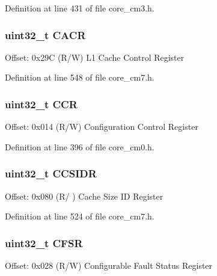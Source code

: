 Definition at line 431 of file core\+\_\+cm3.\+h.

\subsubsection[{\texorpdfstring{C\+A\+CR}{CACR}}]{ uint32\+\_\+t C\+A\+CR}\hypertarget{struct_s_c_b___type_a39711bf09810b078ac81b2c76c6908f6}{}\label{struct_s_c_b___type_a39711bf09810b078ac81b2c76c6908f6}
Offset\+: 0x29C (R/W) L1 Cache Control Register 

Definition at line 548 of file core\+\_\+cm7.\+h.

\subsubsection[{\texorpdfstring{C\+CR}{CCR}}]{ uint32\+\_\+t C\+CR}\hypertarget{struct_s_c_b___type_ad68b5c1f2d9845ef4247cf2d9b041336}{}\label{struct_s_c_b___type_ad68b5c1f2d9845ef4247cf2d9b041336}
Offset\+: 0x014 (R/W) Configuration Control Register 

Definition at line 396 of file core\+\_\+cm0.\+h.

\subsubsection[{\texorpdfstring{C\+C\+S\+I\+DR}{CCSIDR}}]{ uint32\+\_\+t C\+C\+S\+I\+DR}\hypertarget{struct_s_c_b___type_a90c793639fc9470e50e4f4fc4b3464da}{}\label{struct_s_c_b___type_a90c793639fc9470e50e4f4fc4b3464da}
Offset\+: 0x080 (R/ ) Cache Size ID Register 

Definition at line 524 of file core\+\_\+cm7.\+h.

\subsubsection[{\texorpdfstring{C\+F\+SR}{CFSR}}]{ uint32\+\_\+t C\+F\+SR}\hypertarget{struct_s_c_b___type_a0f9e27357254e6e953a94f95bda040b1}{}\label{struct_s_c_b___type_a0f9e27357254e6e953a94f95bda040b1}
Offset\+: 0x028 (R/W) Configurable Fault Status Register 

